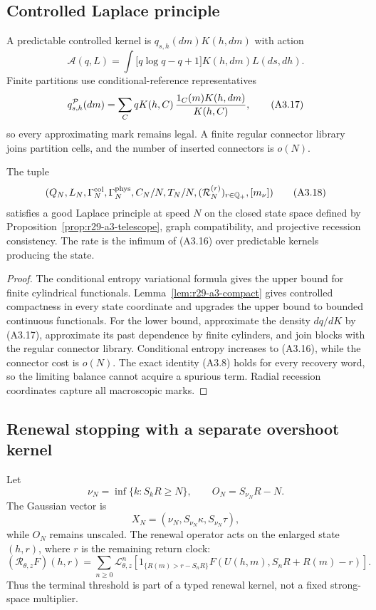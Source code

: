 \subsection{Controlled Laplace principle}

A predictable controlled kernel is $q_{s,h}(dm)K(h,dm)$ with action
\[
 \mathcal A(q,L)=\int\!\bigl[q\log q-q+1\bigr]K(h,dm)L(ds,dh).            \tag{A3.16}
\]
Finite partitions use conditional-reference representatives
\[
 q^{\mathcal P}_{s,h}(dm)
 =\sum_C qK(h,C)\,{1_C(m)K(h,dm)\over K(h,C)},             \tag{A3.17}
\]
so every approximating mark remains legal.  A finite regular connector
library joins partition cells, and the number of inserted connectors is
$o(N)$.

\begin{theorem}
\label{thm:r29-a3-ldp}
The tuple
\[
 (Q_N,L_N,\Gamma_N^{\rm col},\Gamma_N^{\rm phys},
   C_N/N,T_N/N,(\mathcal R_N^{(r)})_{r\in\mathbb Q_+},[m_\nu])            \tag{A3.18}
\]
satisfies a good Laplace principle at speed $N$ on the closed state space
defined by Proposition~\ref{prop:r29-a3-telescope}, graph compatibility, and
projective recession consistency.  The rate is the infimum of (A3.16) over
predictable kernels producing the state.
\end{theorem}

\begin{proof}
The conditional entropy variational formula gives the upper bound for finite
cylindrical functionals.  Lemma~\ref{lem:r29-a3-compact} gives controlled
compactness in every state coordinate and upgrades the upper bound to bounded
continuous functionals.  For the lower bound, approximate the density
$dq/dK$ by (A3.17), approximate its past dependence by finite cylinders, and
join blocks with the regular connector library.  Conditional entropy increases
to (A3.16), while the connector cost is $o(N)$.  The exact identity (A3.8)
holds for every recovery word, so the limiting balance cannot acquire a
spurious term.  Radial recession coordinates capture all macroscopic marks.
\end{proof}

\subsection{Renewal stopping with a separate overshoot kernel}

Let
\[
 \nu_N=\inf\{k:S_kR\ge N\},\qquad O_N=S_{\nu_N}R-N.        \tag{A3.19}
\]
The Gaussian vector is
\[
 X_N=\left(\nu_N,{S_{\nu_N}\kappa},S_{\nu_N}\tau\right),                 \tag{A3.20}
\]
while $O_N$ remains unscaled.  The renewal operator acts on the enlarged state
$(h,r)$, where $r$ is the remaining return clock:
\[
 (\mathscr R_{\theta,z}F)(h,r)
 =\sum_{n\ge0}\mathcal L_{\theta,z}^n
   \left[1_{\{R(m)>r-S_nR\}}F(U(h,m),S_nR+R(m)-r)\right]. \tag{A3.21}
\]
Thus the terminal threshold is part of a typed renewal kernel, not a fixed
strong-space multiplier.

